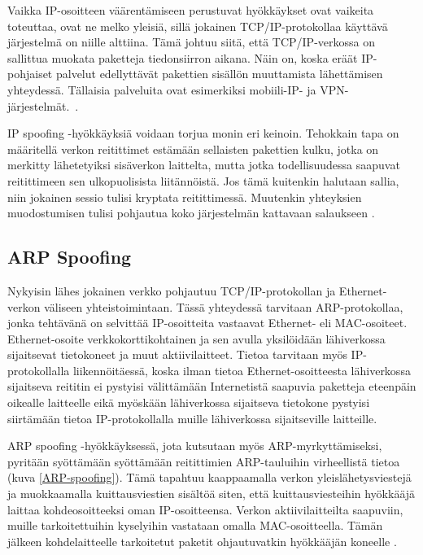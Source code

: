 Vaikka IP-osoitteen väärentämiseen perustuvat hyökkäykset ovat
vaikeita toteuttaa, ovat ne melko yleisiä, sillä jokainen
TCP/IP-protokollaa käyttävä järjestelmä on niille alttiina. Tämä
johtuu siitä, että TCP/IP-verkossa on sallittua muokata paketteja
tiedonsiirron aikana. Näin on, koska eräät IP-pohjaiset palvelut
edellyttävät pakettien sisällön muuttamista lähettämisen
yhteydessä. Tällaisia palveluita ovat esimerkiksi mobiili-IP- ja
VPN-järjestelmät.~\cite{DDOS}.

IP spoofing -hyökkäyksiä voidaan torjua monin eri keinoin. Tehokkain
tapa on määritellä verkon reitittimet estämään sellaisten pakettien
kulku, jotka on merkitty lähetetyiksi sisäverkon laittelta, mutta
jotka todellisuudessa saapuvat reitittimeen sen ulkopuolisista
liitännöistä. Jos tämä kuitenkin halutaan sallia, niin jokainen sessio
tulisi kryptata reitittimessä. Muutenkin yhteyksien muodostumisen
tulisi pohjautua koko järjestelmän kattavaan salaukseen \cite{WEBS}.


\subsection{ARP Spoofing}

Nykyisin lähes jokainen verkko pohjautuu TCP/IP-protokollan ja
Ethernet-verkon väliseen yhteistoimintaan. Tässä yhteydessä tarvitaan
ARP-pro\-to\-kol\-laa, jonka tehtävänä on selvittää IP-osoitteita
vastaavat Ethernet- eli MAC-osoiteet. Ethernet-osoite
verkkokorttikohtainen ja sen avulla yksilöidään lähiverkossa
sijaitsevat tietokoneet ja muut aktiivilaitteet.  Tietoa tarvitaan
myös IP-protokollalla liikennöitäessä, koska ilman tietoa
Ethernet-osoitteesta lähiverkossa sijaitseva reititin ei pystyisi
välittämään Internetistä saapuvia paketteja eteenpäin oikealle
laitteelle eikä myöskään lähiverkossa sijaitseva tietokone pystyisi
siirtämään tietoa IP-protokollalla muille lähiverkossa sijaitseville
laitteille.

ARP spoofing -hyökkäyksessä, jota kutsutaan myös ARP-myrkyttämiseksi,
pyritään syöttämään syöttämään reitittimien ARP-tauluihin virheellistä
tietoa (kuva \ref{ARP-spoofing}). Tämä tapahtuu kaappaamalla verkon
yleislähetysviestejä ja muokkaamalla kuittausviestien sisältöä siten,
että kuittausviesteihin hyökkääjä laittaa kohdeosoitteeksi oman
IP-osoitteensa. Verkon aktiivilaitteilta saapuviin, muille
tarkoitettuihin kyselyihin vastataan omalla MAC-osoitteella.  Tämän
jälkeen kohdelaitteelle tarkoitetut paketit ohjautuvatkin hyökkääjän
koneelle \cite{WEBS}.

